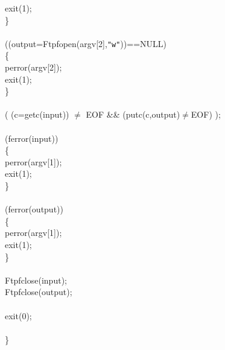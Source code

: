 \begin{flushleft}
\hspace*{6\indentation}exit(1);\mbox{}\\
\hspace*{4\indentation}\}\mbox{}\\
\hspace*{2\indentation}\mbox{}\\
\hspace*{2\indentation}{\bf if\/} ((output=Ftpfopen(argv[2],{\tt "w"}))==NULL)\mbox{}\\
\hspace*{4\indentation}\{\mbox{}\\
\hspace*{6\indentation}perror(argv[2]);\mbox{}\\
\hspace*{6\indentation}exit(1);\mbox{}\\
\hspace*{4\indentation}\}\mbox{}\\
\hspace*{2\indentation}\mbox{}\\
\hspace*{2\indentation}{\bf while\/} ( (c=getc(input)) $\neq$ EOF \&\&  (putc(c,output)$\neq$EOF) );\mbox{}\\
\mbox{}\\
\hspace*{2\indentation}{\bf if\/} (ferror(input))\mbox{}\\
\hspace*{4\indentation}\{\mbox{}\\
\hspace*{6\indentation}perror(argv[1]);\mbox{}\\
\hspace*{6\indentation}exit(1);\mbox{}\\
\hspace*{4\indentation}\}\mbox{}\\
\hspace*{2\indentation}\mbox{}\\
\hspace*{2\indentation}{\bf if\/} (ferror(output))\mbox{}\\
\hspace*{4\indentation}\{\mbox{}\\
\hspace*{6\indentation}perror(argv[1]);\mbox{}\\
\hspace*{6\indentation}exit(1);\mbox{}\\
\hspace*{4\indentation}\}\mbox{}\\
\mbox{}\\
\hspace*{2\indentation}Ftpfclose(input);\mbox{}\\
\hspace*{2\indentation}Ftpfclose(output);\mbox{}\\
\mbox{}\\
\hspace*{2\indentation}exit(0);\mbox{}\\
\hspace*{2\indentation}\mbox{}\\
\}\mbox{}\\
\end{flushleft}

